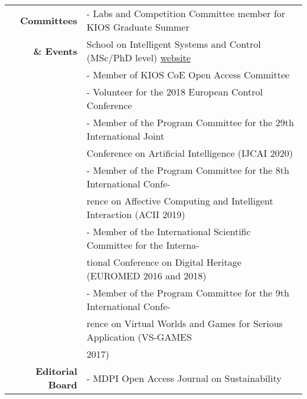 \documentclass[a4paper,10pt]{article}
\begin{document}
\begin{longtable}{r p{11cm}}
\textbf{Committees}
& - Labs and Competition Committee member for KIOS Graduate Summer \\ 
\textbf{\& Events}& \hspace{0.05in} School on Intelligent Systems and Control (MSc/PhD level) \href{https://www.kios.ucy.ac.cy/summer-school/?page_id=1794}{website}\\
& - Member of KIOS CoE Open Access Committee \\
& - Volunteer for the 2018 European Control Conference\\
& - Member of the Program Committee for the  29th International Joint\\
& \hspace{0.05in} Conference on Artificial Intelligence (IJCAI 2020)\\
& - Member of the Program Committee for the 8th International Confe-\\
& \hspace{0.05in} rence on Affective Computing and Intelligent Interaction (ACII 2019)\\
& - Member of the International Scientific Committee for the Interna-\\
& \hspace{0.05in} tional Conference on Digital Heritage (EUROMED 2016 and 2018)\\
& - Member of the Program Committee for the 9th International Confe-\\
& \hspace{0.05in} rence on Virtual Worlds and Games for Serious Application (VS-GAMES\\ &\hspace{0.05in} 2017)

\vspace{0.01in}\\

\textbf{Editorial Board}
& - MDPI Open Access Journal on Sustainability

\vspace{0.01in}\\


\end{longtable}
\end{document}
